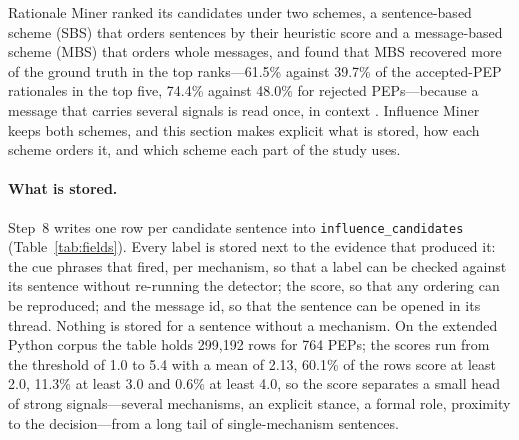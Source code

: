\documentclass[sigconf,screen]{acmart}
\begin{document}
Rationale Miner ranked its candidates under two schemes, a sentence-based scheme (SBS) that orders sentences by their heuristic score and a message-based scheme (MBS) that orders whole messages, and found that MBS recovered more of the ground truth in the top ranks---61.5\% against 39.7\% of the accepted-PEP rationales in the top five, 74.4\% against 48.0\% for rejected PEPs---because a message that carries several signals is read once, in context \cite{sharma2021rationale}. Influence Miner keeps both schemes, and this section makes explicit what is stored, how each scheme orders it, and which scheme each part of the study uses.

\paragraph{What is stored.} Step~8 writes one row per candidate sentence into \texttt{influence\_candidates} (Table~\ref{tab:fields}). Every label is stored next to the evidence that produced it: the cue phrases that fired, per mechanism, so that a label can be checked against its sentence without re-running the detector; the score, so that any ordering can be reproduced; and the message id, so that the sentence can be opened in its thread. Nothing is stored for a sentence without a mechanism. On the extended Python corpus the table holds 299,192 rows for 764 PEPs; the scores run from the threshold of 1.0 to 5.4 with a mean of 2.13, 60.1\% of the rows score at least 2.0, 11.3\% at least 3.0 and 0.6\% at least 4.0, so the score separates a small head of strong signals---several mechanisms, an explicit stance, a formal role, proximity to the decision---from a long tail of single-mechanism sentences.
\end{document}
